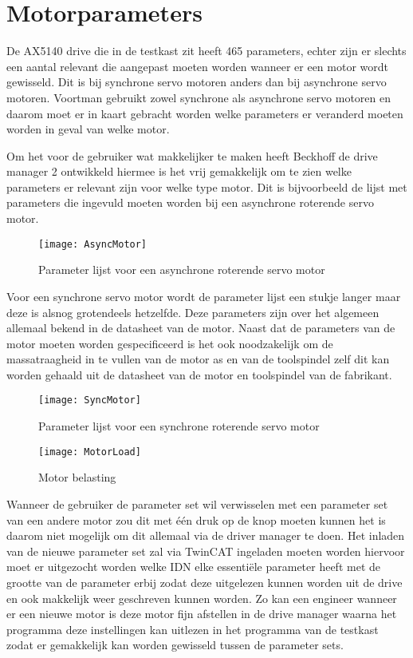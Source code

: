 \section{Motorparameters}

De \gls{AX5140} drive die in de testkast zit heeft 465 parameters, echter zijn er slechts een aantal relevant die aangepast moeten worden wanneer er een motor wordt gewisseld. Dit is bij synchrone servo motoren anders dan bij asynchrone servo motoren. Voortman gebruikt zowel synchrone als asynchrone servo motoren en daarom moet er in kaart gebracht worden welke parameters er veranderd moeten worden in geval van welke motor.

\vspace{0.5cm}

Om het voor de gebruiker wat makkelijker te maken heeft Beckhoff de drive manager 2 ontwikkeld hiermee is het vrij gemakkelijk om te zien welke parameters er relevant zijn voor welke type motor. Dit is bijvoorbeeld de lijst met parameters die ingevuld moeten worden bij een asynchrone roterende servo motor.

\begin{figure}[H]
	\centering
	\texttt{[image: AsyncMotor]}
	\label{fig:AsyncMotor}
	\caption{Parameter lijst voor een asynchrone roterende servo motor}
\end{figure}

Voor een synchrone servo motor wordt de parameter lijst een stukje langer maar deze is alsnog grotendeels hetzelfde. Deze parameters zijn over het algemeen allemaal bekend in de datasheet van de motor. Naast dat de parameters van de motor moeten worden gespecificeerd is het ook noodzakelijk om de massatraagheid in te vullen van de motor as en van de toolspindel zelf dit kan worden gehaald uit de datasheet van de motor en toolspindel van de fabrikant.

\begin{figure}[H]
	\centering
	\texttt{[image: SyncMotor]}
	\label{fig:SyncMotor}
	\caption{Parameter lijst voor een synchrone roterende servo motor}
\end{figure}

\begin{figure}[H]
	\centering
	\texttt{[image: MotorLoad]}
	\label{fig:MotorLoad}
	\caption{Motor belasting}
\end{figure}

Wanneer de gebruiker de parameter set wil verwisselen met een parameter set van een andere motor zou dit met één druk op de knop moeten kunnen het is daarom niet mogelijk om dit allemaal via de driver manager te doen. Het inladen van de nieuwe parameter set zal via TwinCAT ingeladen moeten worden hiervoor moet er uitgezocht worden welke IDN elke essentiële parameter heeft met de grootte van de parameter erbij zodat deze uitgelezen kunnen worden uit de drive en ook makkelijk weer geschreven kunnen worden. Zo kan een engineer wanneer er een nieuwe motor is deze motor fijn afstellen in de drive manager waarna het programma deze instellingen kan uitlezen in het programma van de testkast zodat er gemakkelijk kan worden gewisseld tussen de parameter sets.

